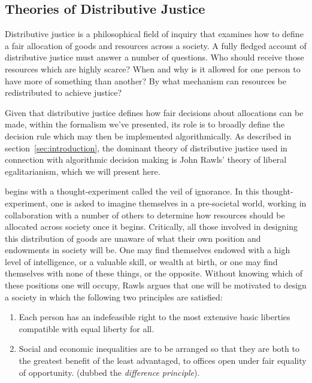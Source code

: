 \subsection{Theories of Distributive Justice}

Distributive justice is a philosophical field of inquiry that examines how to
define a fair allocation of goods and resources across a society. A fully
fledged account of distributive justice must answer a number of questions. Who
should receive those resources which are highly scarce? When and why is it 
allowed for one person to have more of something than another? By what mechanism
can resources be redistributed to achieve justice?

Given that distributive justice defines how fair decisions about allocations can
be made, within the formalism we've presented, its role is to broadly define the
decision rule which may then be implemented algorithmically. As described in
section~\ref{sec:introduction}, the dominant theory of distributive justice used
in connection with algorithmic decision making is John Rawls' theory of liberal
egalitarianism, which we will present here.

\cite{Rawls_1971} begins with a thought-experiment called the veil of ignorance.
In this thought-experiment, one is asked to imagine themselves in a pre-societal
world, working in collaboration with a number of others to determine how
resources should be allocated across society once it begins. Critically, all
those involved in designing this distribution of goods are unaware of what their
own position and endowments in society will be. One may find themselves endowed
with a high level of intelligence, or a valuable skill, or wealth at birth, or
one may find themselves with none of these things, or the opposite. Without
knowing which of these positions one will occupy, Rawls argues that one will be
motivated to design a society in which the following two principles are
satisfied:

\begin{enumerate}
    \item Each person has an indefeasible right to the most extensive basic 
          liberties compatible with equal liberty for all.
    \item Social and economic inequalities are to be arranged so that they are
          both to the greatest benefit of the least advantaged, to offices
          open under fair equality of opportunity. (dubbed the
          \textit{difference principle}).
\end{enumerate}

